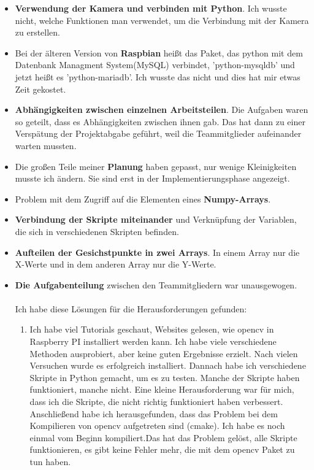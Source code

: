 \begin{itemize}
	\item \textbf{Verwendung der Kamera und verbinden mit Python}. Ich wusste nicht, welche Funktionen man verwendet, um die Verbindung mit der Kamera zu erstellen. 
	\item Bei der \"alteren Version von \textbf{Raspbian} hei{\ss}t das Paket, das python mit dem Datenbank Managment System(MySQL) verbindet, 'python-mysqldb' und jetzt hei{\ss}t es 'python-mariadb'. Ich wusste das nicht und dies hat mir etwas Zeit gekostet.
	\item \textbf{Abh\"angigkeiten zwischen einzelnen Arbeitsteilen}. Die Aufgaben waren so geteilt, dass es Abh\"angigkeiten zwischen ihnen gab. Das hat dann zu einer Versp\"atung der Projektabgabe gef\"uhrt, weil die Teammitglieder aufeinander warten mussten.
	\item Die gro{\ss}en Teile meiner \textbf{Planung} haben gepasst, nur wenige Kleinigkeiten musste ich \"andern. Sie sind erst in der Implementierungsphase angezeigt.
	\item Problem mit dem Zugriff auf die Elementen eines \textbf{Numpy-Arrays}.
	\item \textbf{Verbindung der Skripte miteinander} und Verkn\"upfung der Variablen, die sich in verschiedenen Skripten befinden.
	\item \textbf{Aufteilen der Gesichstpunkte in zwei Arrays}. In einem Array nur die X-Werte und in dem anderen Array nur die Y-Werte. 
	\item \textbf{Die Aufgabenteilung} zwischen den Teammitgliedern war unausgewogen. 
	\\
	\\
Ich habe diese L\"osungen f\"ur die Herausforderungen gefunden: 
\begin{enumerate}
	\item Ich habe viel Tutorials geschaut, Websites gelesen, wie opencv in Raspberry PI installiert werden kann. Ich habe viele verschiedene Methoden ausprobiert, aber keine guten Ergebnisse erzielt. Nach vielen Versuchen wurde es erfolgreich installiert. Dannach habe ich verschiedene Skripte in Python gemacht, um es zu testen. Manche der Skripte haben funktioniert, manche nicht. Eine kleine Herausforderung war f\"ur mich, dass ich die Skripte, die nicht richtig funktioniert haben verbessert. Anschlie{\ss}end habe ich herausgefunden, dass das Problem bei dem Kompilieren von opencv aufgetreten sind (cmake). Ich habe es noch einmal vom Beginn kompiliert.Das hat das Problem gel\"ost, alle Skripte funktionieren, es gibt keine Fehler mehr, die mit dem opencv Paket zu tun haben.
	

\end{enumerate}
\end{itemize}
